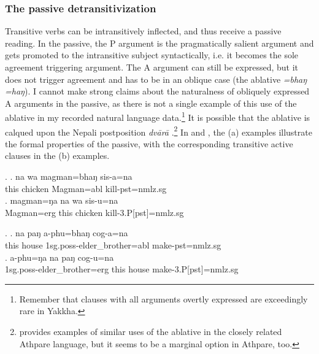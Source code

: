 
\subsubsection{The passive detransitivization}\label{detr-pass}

Transitive verbs can be intransitively inflected, and thus receive a passive reading. In the passive, the P argument is the pragmatically salient argument and gets promoted to the intransitive subject syntactically, i.e. it becomes the sole agreement triggering argument. The  A argument can still be expressed, but it does not trigger agreement and has to be in an oblique case (the ablative \emph{=bhaŋ \ti =haŋ}). I cannot make strong claims about the naturalness of obliquely expressed A arguments in the passive, as there is not a single example of this use of the ablative in my recorded natural language data.\footnote{Remember that clauses with all arguments overtly expressed are exceedingly rare in Yakkha.}  It is possible that the ablative is calqued upon the Nepali postposition \emph{dvārā} .\footnote{\citet[123]{Ebert1997A-grammar} provides examples of similar uses of the ablative in the closely related Athpare language, but it seems to be a marginal option in Athpare, too.}  In  \Next and \NNext, the (a) examples illustrate the formal properties of the passive, with the corresponding transitive active clauses in the (b) examples.

\ex. \ag. na wa magman=bhaŋ sis-a=na\\
			this chicken  Magman{\sc =abl} kill{\sc [3sg]-pst=nmlz.sg}\\
	\bg. magman=ŋa na wa sis-u=na  \\
		Magman{\sc =erg}	this chicken  kill{\sc -3.P[pst]=nmlz.sg}\\
		
	\ex. \ag.  na paŋ a-phu=bhaŋ cog-a=na \\
	this house  {\sc 1sg.poss-}elder\_brother{\sc =abl} make{\sc [3sg]-pst=nmlz.sg}\\
	\bg. a-phu=ŋa na paŋ cog-u=na \\
	 {\sc 1sg.poss-}elder\_brother{\sc =erg} this house make{\sc -3.P[pst]=nmlz.sg}\\


